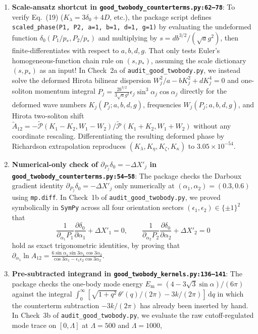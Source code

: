 \documentclass[11pt,a4paper]{article}
\newcommand{\dd}{\mathrm{d}}
\begin{document}
\begin{enumerate}
\item \textbf{Scale-ansatz shortcut in \texttt{good\_twobody\_counterterms.py:62--78}}: To verify Eq.~(19) ($K_\lambda = 3\delta_0 + 4D$, etc.), the package script defines \texttt{scaled\_phase(P1, P2, a=1, b=1, d=1, g=1)} by evaluating the undeformed function $\delta_0(P_1/p_*, P_2/p_*)$ and multiplying by $s = d b^{3/2}/(\sqrt{a}g^2)$, then finite-differentiates with respect to $a,b,d,g$. That only tests Euler's homogeneous-function chain rule on $(s, p_*)$, assuming the scale dictionary $(s, p_*)$ as an input! In Check~2a of \texttt{audit\_good\_twobody.py}, we instead solve the deformed Hirota bilinear dispersion $W_j^2/a - b K_j^2 + d K_j^4 = 0$ and one-soliton momentum integral $P_j = \frac{2 b^{3/2}}{3\sqrt{a}g^2}\epsilon_j\sin^3\alpha_j\cos\alpha_j$ directly for the deformed wave numbers $K_j(P_j; a,b,d,g)$, frequencies $W_j(P_j; a,b,d,g)$, and Hirota two-soliton shift $\tilde{A}_{12} = -\tilde{\mathcal{P}}(K_1-K_2,W_1-W_2)/\tilde{\mathcal{P}}(K_1+K_2,W_1+W_2)$ without any coordinate rescaling. Differentiating the resulting deformed phase by Richardson extrapolation reproduces $(K_\lambda, K_\eta, K_\zeta, K_\kappa)$ to $3.05\times 10^{-54}$.
\item \textbf{Numerical-only check of $\partial_{P_j}\delta_0 = -\Delta X'_j$ in \texttt{good\_twobody\_counterterms.py:54--58}}: The package checks the Darboux gradient identity $\partial_{P_j}\delta_0 = -\Delta X'_j$ only numerically at $(\alpha_1,\alpha_2)=(0.3,0.6)$ using \texttt{mp.diff}. In Check~1b of \texttt{audit\_good\_twobody.py}, we proved symbolically in \texttt{SymPy} across all four orientation sectors $(\epsilon_1,\epsilon_2) \in \{\pm 1\}^2$ that
\begin{equation}
\frac{1}{\partial_{\alpha_1}P_1}\frac{\partial\delta_0}{\partial\alpha_1} + \Delta X'_1 = 0, \qquad
\frac{1}{\partial_{\alpha_2}P_2}\frac{\partial\delta_0}{\partial\alpha_2} + \Delta X'_2 = 0
\end{equation}
hold as exact trigonometric identities, by proving that $\partial_{\alpha_1}\ln A_{12} = \frac{6\sin\alpha_1\sin 3\alpha_1\cos 3\alpha_2}{\cos 3\alpha_1 - \epsilon_1\epsilon_2\cos 3\alpha_2}$.
\item \textbf{Pre-subtracted integrand in \texttt{good\_twobody\_kernels.py:136--141}}: The package checks the one-body mode energy $E_{\mathrm{m}} = (4-3\sqrt{3}\sin\alpha)/(6\pi)$ against the integral $\int_0^\infty [\sqrt{1+q^2}\,\theta'(q)/(2\pi) - 3k/(2\pi)]\,\dd q$ in which the counterterm subtraction $-3k/(2\pi)$ has already been inserted by hand. In Check~3b of \texttt{audit\_good\_twobody.py}, we evaluate the raw cutoff-regulated mode trace on $[0,\Lambda]$ at $\Lambda = 500$ and $\Lambda = 1000$,

\end{enumerate}
\end{document}
